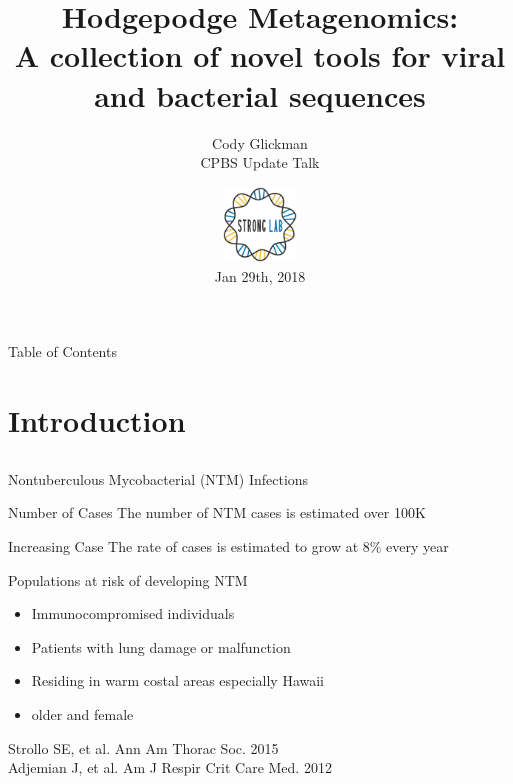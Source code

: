 \documentclass[11pt]{beamer}
\author{Cody Glickman \\ CPBS Update Talk}
\title{Hodgepodge Metagenomics: \\ A collection of novel tools for viral and bacterial sequences}
\date{ \includegraphics[height=2cm, width=2cm]{lablogo.png} \\ Jan 29th, 2018}
\begin{document}
	\maketitle
	\begin{frame}{Table of Contents}
		\tableofcontents
	\end{frame}
	
	
	
\section{Introduction}
\subsection{}

	\begin{frame}{Nontuberculous Mycobacterial (NTM) Infections}
		\begin{block}{Number of Cases}
		The number of NTM cases is estimated over 100K
		\end{block}
		
		\begin{block}{Increasing Case}
		The rate of cases is estimated to grow at 8\% every year
		\end{block}
		
		
		\begin{block}{Populations at risk of developing NTM}
		\begin{itemize}
		\item Immunocompromised individuals 
		\item Patients with lung damage or malfunction 
		\item Residing in warm costal areas especially Hawaii
		\item older and female
		\end{itemize}
		\end{block} 
		
		\begin{block}
		
		\end{block}
		
	\tiny{Strollo SE, et al. Ann Am Thorac Soc. 2015 \\
	Adjemian J, et al. Am J Respir Crit Care Med. 2012}
	
	\end{frame}
	
\end{document}

